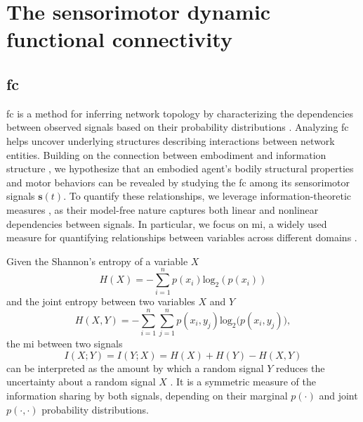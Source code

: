 \section{The sensorimotor dynamic functional connectivity}

\subsection{\Acl{fc}}
\ac{fc} is a method for inferring network topology by characterizing the dependencies between observed signals based on their probability distributions \cite{Friston2011Functionaleffectiveconnectivity}. Analyzing \ac{fc} helps uncover underlying structures describing interactions between network entities. Building on the connection between embodiment and information structure \cite{Pfeifer2007Selforganizationembodiment}, we hypothesize that an embodied agent’s bodily structural properties and motor behaviors can be revealed by studying the \ac{fc} among its sensorimotor signals $\bm{s}(t)$. To quantify these relationships, we leverage information-theoretic measures \cite{Bonsignorio2020EntropyBasedMetrics,Bonsignorio2013Quantifyingevolutionaryself}, as their model-free nature captures both linear and nonlinear dependencies between signals. In particular, we focus on \ac{mi}, a widely used measure for quantifying relationships between variables across different domains \cite{Steuer2002mutualinformationdetecting}.

Given the Shannon's entropy of a variable $X$  
\begin{equation}\label{eq:entropy}
	H(X) = -\sum_{i=1}^{n}p(x_i)\text{log}_2\left(p\left(x_i\right)\right)
\end{equation}
and the joint entropy between two variables $ X $ and $ Y $ 
\begin{equation}\label{eq:joint_entropy}
	H(X,Y) = -\sum_{i=1}^{n}\sum_{j=1}^{n} p(x_i,y_j)\text{log}_2\big(p\left(x_i,y_j\right)\big),
\end{equation}
the \ac{mi} between two signals 
\begin{equation}\label{eq:mutual_information}
	I\left(X;Y\right) =I\left(Y;X\right) = H(X) + H(Y) - H(X,Y)
\end{equation}
can be interpreted as the amount by which a random signal $ Y $ reduces the uncertainty about a random signal $ X $ \cite{Cover1999Elementsinformationtheory}. It is a symmetric measure of the information sharing by both signals, depending on their marginal $p(\cdot)$ and joint $p(\cdot,\cdot)$ probability distributions.

